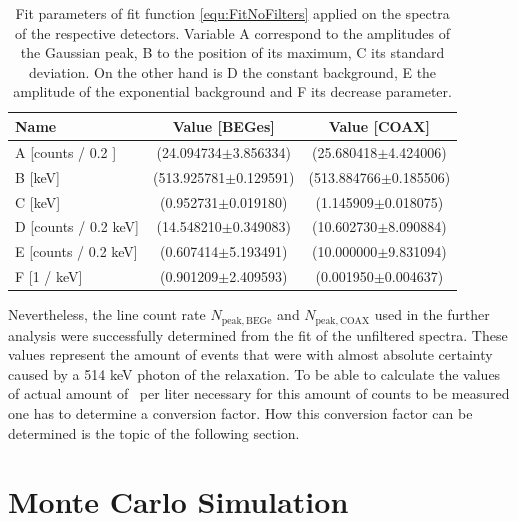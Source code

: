 \documentclass[encoding=utf8,british]{tumphthesis}
\begin{document}
\begin{table}[t!]
	\centering
	\begin{tabular}{|l|c|c|}
		\hline
		Name	& Value [BEGes] & Value [COAX]\\ 
		\hline
		A [counts  / 0.2 ] &	(24.094734$\pm$3.856334)&	(25.680418$\pm$4.424006)\\	
		\hline
		B [keV] &	(513.925781$\pm$0.129591)&	(513.884766$\pm$0.185506)\\	
		\hline
		C [keV] &	(0.952731$\pm$0.019180)	&	(1.145909$\pm$0.018075)\\
		\hline
		D [counts / 0.2 keV] &	(14.548210$\pm$0.349083)	&	(10.602730$\pm$8.090884)\\
		\hline
		E [counts / 0.2 keV] &	(0.607414$\pm$5.193491)	&	(10.000000$\pm$9.831094)\\
		\hline	
		F [1 / keV] &	(0.901209$\pm$2.409593)	&	(0.001950$\pm$0.004637)\\
		\hline
	\end{tabular}
	\label{tab:FitParFilter}
	\caption{
		Fit parameters of fit function \ref{equ:FitNoFilters} applied on the spectra of the respective detectors. 
		Variable A correspond to the amplitudes of the Gaussian peak, B to the position of its maximum, C its standard deviation. 
		On the other hand is D the constant background, E the amplitude of the exponential background and F its decrease parameter.
		}
\end{table}

Nevertheless, the line count rate $N_{\mathrm{peak,BEGe}}$ and $N_{\mathrm{peak,COAX}}$ used in the further analysis were successfully determined from the fit of the unfiltered spectra.
These values represent the amount of events that were with almost absolute certainty caused by a 514 keV photon of the  relaxation.  
To be able to calculate the values of actual amount of \Kr\ per liter necessary for this amount of counts to be measured one has to determine a conversion factor. 
How this conversion factor can be determined is the topic of the following section.
\\

\section{Monte Carlo Simulation}
\label{sec:MonteCarlo514}
\end{document}
